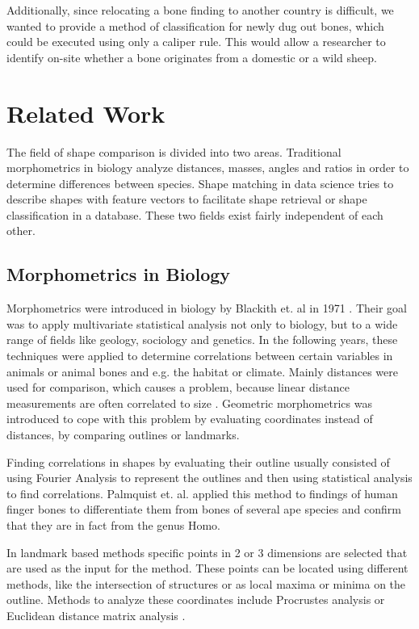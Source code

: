 \documentclass[pdftex,12pt,a4paper]{report}
\begin{document}
Additionally, since relocating a bone finding to another country is difficult, we wanted to provide a method of classification for newly dug out bones, which could be executed using only a caliper rule. This would allow a researcher to identify on-site whether a bone originates from a domestic or a wild sheep. 

\chapter{Related Work}
\label{chapter:related}

The field of shape comparison is divided into two areas. Traditional morphometrics in biology analyze distances, masses, angles and ratios in order to determine differences between species. Shape matching in data science tries to describe shapes with feature vectors to facilitate shape retrieval or shape classification in a database. These two fields exist fairly independent of each other.

\section{Morphometrics in Biology}

Morphometrics were introduced in biology by Blackith et. al in 1971 \cite{blackith1971multivariate}. Their goal was to apply multivariate statistical analysis not only to biology, but to a wide range of fields like geology, sociology and genetics. In the following years, these techniques were applied to determine correlations between certain variables in animals or animal bones and e.g. the habitat or climate. Mainly distances were used for comparison, which causes a problem, because linear distance measurements are often correlated to size \cite{bookstein1985morphometrics}. Geometric morphometrics was introduced to cope with this problem by evaluating coordinates instead of distances, by comparing outlines or landmarks.

Finding correlations in shapes by evaluating their outline usually consisted of using Fourier Analysis to represent the outlines and then using statistical analysis to find correlations. Palmquist et. al. \cite{palmqvist1996comparative} applied this method to findings of human finger bones to differentiate them from bones of several ape species and confirm that they are in fact from the genus Homo. 

In landmark based methods specific points in 2 or 3 dimensions are selected that are used as the input for the method. These points can be located using different methods, like the intersection of structures or as local maxima or minima on the outline. Methods to analyze these coordinates include Procrustes analysis \cite{small1996statistical} or Euclidean distance matrix analysis \cite{lele1991euclidean}.
\end{document}
